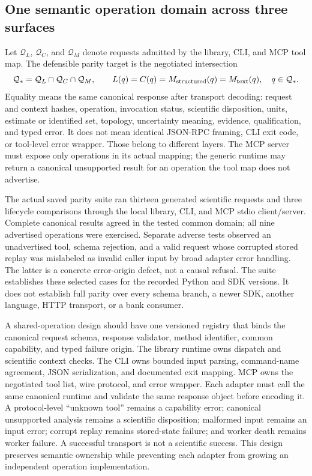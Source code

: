 \subsection{One semantic operation domain across three surfaces}
\label{exec17:shared-operation}

Let $\mathcal Q_L$, $\mathcal Q_C$, and $\mathcal Q_M$ denote requests admitted
by the library, CLI, and MCP tool map. The defensible parity target is the
negotiated intersection
\[
 \mathcal Q_* = \mathcal Q_L\cap\mathcal Q_C\cap\mathcal Q_M,
 \qquad
 L(q)=C(q)=M_{\rm structured}(q)=M_{\rm text}(q),\quad q\in\mathcal Q_*.
\]
Equality means the same canonical response after transport decoding: request
and context hashes, operation, invocation status, scientific disposition,
units, estimate or identified set, topology, uncertainty meaning, evidence,
qualification, and typed error. It does not mean identical JSON-RPC framing,
CLI exit code, or tool-level error wrapper. Those belong to different layers.
The MCP server must expose only operations in its actual mapping; the generic
runtime may return a canonical unsupported result for an operation the tool
map does not advertise.~\citep{exec16_parity_design,exec16_parity_observed}

The actual saved parity suite ran thirteen generated scientific requests and
three lifecycle comparisons through the local library, CLI, and MCP stdio
client/server. Complete canonical results agreed in the tested common domain;
all nine advertised operations were exercised. Separate adverse tests observed
an unadvertised tool, schema rejection, and a valid request whose corrupted
stored replay was mislabeled as invalid caller input by broad adapter error
handling. The latter is a concrete error-origin defect, not a causal refusal.
The suite establishes these selected cases for the recorded Python and SDK
versions. It does not establish full parity over every schema branch, a newer
SDK, another language, HTTP transport, or a bank consumer.
\citep{exec16_parity_observed}

A shared-operation design should have one versioned registry that binds the
canonical request schema, response validator, method identifier, common
capability, and typed failure origin. The library runtime owns dispatch and
scientific context checks. The CLI owns bounded input parsing, command-name
agreement, JSON serialization, and documented exit mapping. MCP owns the
negotiated tool list, wire protocol, and error wrapper. Each adapter must call
the same canonical runtime and validate the same response object before
encoding it. A protocol-level “unknown tool” remains a capability error;
canonical unsupported analysis remains a scientific disposition; malformed
input remains an input error; corrupt replay remains stored-state failure;
and worker death remains worker failure. A successful transport is not a
scientific success. This design preserves semantic ownership while preventing
each adapter from growing an independent operation implementation.
\citep{exec16_parity_design,exec14_failure_design}

